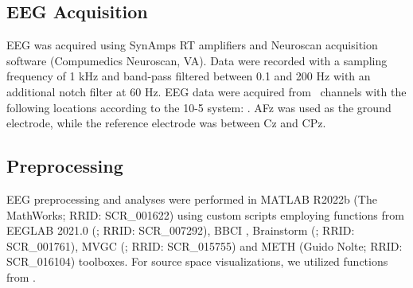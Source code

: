 \subsection{EEG Acquisition}

EEG was acquired using SynAmps RT amplifiers and Neuroscan acquisition software (Compumedics Neuroscan, VA). Data were recorded with a sampling frequency of 1 kHz and band-pass filtered between 0.1 and 200 Hz with an additional notch filter at 60 Hz. EEG data were acquired from \numChannelsOrig~channels with the following locations according to the 10-5 system: \channelsOrig. AFz was used as the ground electrode, while the reference electrode was between Cz and CPz.

\subsection{Preprocessing}

EEG preprocessing and analyses were performed in MATLAB R2022b (The MathWorks; RRID: SCR\_001622) using custom scripts employing functions from EEGLAB 2021.0 (\cite{EEGLAB_Delorme2004}; RRID: SCR\_007292), BBCI \citep{Blankertz2016}, Brainstorm (\cite{Brainstorm_Tadel2011}; RRID: SCR\_001761), MVGC (\cite{MVGC_Barnett2014}; RRID: SCR\_015755) and METH (Guido Nolte; RRID: SCR\_016104) toolboxes. For source space visualizations, we utilized functions from \citep{HaufeEwald2019}.

\medskip


